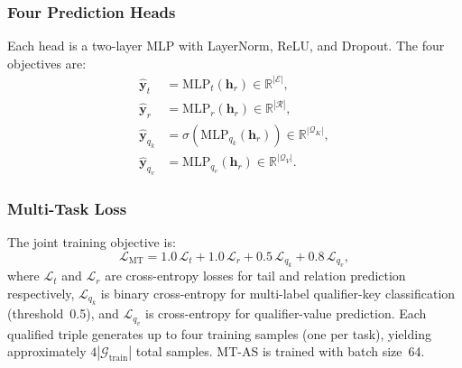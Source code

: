 \documentclass[10pt,journal,compsoc]{IEEEtran}
\begin{document}
\subsubsection{Four Prediction Heads}
Each head is a two-layer MLP with LayerNorm, ReLU, and
Dropout.
The four objectives are:
\begin{align}
  \hat{\mathbf{y}}_t
  &= \mathrm{MLP}_t(\mathbf{h}_r)
   \in \mathbb{R}^{|\mathcal{E}|},
  \label{eq:mt_tail} \\
  \hat{\mathbf{y}}_r
  &= \mathrm{MLP}_r(\mathbf{h}_r)
   \in \mathbb{R}^{|\mathcal{R}|},
  \label{eq:mt_rel} \\
  \hat{\mathbf{y}}_{q_k}
  &= \sigma\!\left(
       \mathrm{MLP}_{q_k}(\mathbf{h}_r)
     \right)
   \in \mathbb{R}^{|\mathcal{Q}_K|},
  \label{eq:mt_qkey} \\
  \hat{\mathbf{y}}_{q_v}
  &= \mathrm{MLP}_{q_v}(\mathbf{h}_r)
   \in \mathbb{R}^{|\mathcal{Q}_V|}.
  \label{eq:mt_qval}
\end{align}

\subsubsection{Multi-Task Loss}
The joint training objective is:
\begin{equation}
  \mathcal{L}_{\mathrm{MT}}
  = 1.0\,\mathcal{L}_t
  + 1.0\,\mathcal{L}_r
  + 0.5\,\mathcal{L}_{q_k}
  + 0.8\,\mathcal{L}_{q_v},
  \label{eq:mt_loss}
\end{equation}
where $\mathcal{L}_t$ and $\mathcal{L}_r$ are cross-entropy
losses for tail and relation prediction respectively,
$\mathcal{L}_{q_k}$ is binary cross-entropy for multi-label
qualifier-key classification (threshold~0.5), and
$\mathcal{L}_{q_v}$ is cross-entropy for qualifier-value
prediction.
Each qualified triple generates up to four training samples
(one per task), yielding approximately
$4|\mathcal{G}_{\mathrm{train}}|$ total samples.
MT-AS is trained with batch size~64.
\end{document}
